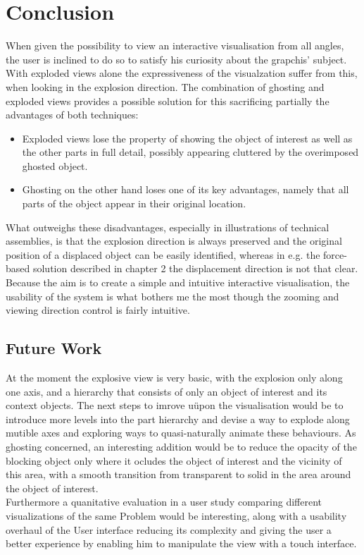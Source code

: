 \chapter{Conclusion}
When given the possibility to view an interactive visualisation from all angles, the user is inclined to do so to satisfy his curiosity about the grapchis' subject. With exploded views alone the expressiveness of the visualzation suffer from this, when looking in the explosion direction. The combination of ghosting and exploded views provides a possible solution for this sacrificing partially the advantages of both techniques:
\begin{itemize}
\item Exploded views lose the property of showing the object of interest as well as the other parts in full detail, possibly appearing cluttered by the overimposed ghosted object.
\item Ghosting on the other hand loses one of its key advantages, namely that all parts of the object appear in their original location.
\end{itemize}
What outweighs these disadvantages, especially in illustrations of technical assemblies, is that the explosion direction is always preserved and the original position of a displaced object can be easily identified, whereas in e.g. the force-based solution described in chapter 2 the displacement direction is not that clear.\\
Because the aim is to create a simple and intuitive interactive visualisation, the usability of the system is what bothers me the most though the zooming and viewing direction control is fairly intuitive.
\section{Future Work}
At the moment the explosive view is very basic, with the explosion only along one axis, and a hierarchy that consists of only  an object of interest and its context objects. The next steps to imrove uüpon the visualisation would be to introduce more levels into the part hierarchy and devise a way to explode along mutible axes and exploring ways to quasi-naturally animate these behaviours. As ghosting concerned, an interesting addition would be to reduce the opacity of the blocking object only where it ocludes the object of interest and the vicinity of this area, with a smooth transition from transparent to solid in the area around the object of interest.\\
Furthermore a quanitative evaluation in a user study comparing different visualizations of the same Problem would be interesting, along with a usability overhaul of the User interface reducing its complexity and giving the user a better experience by enabling him to manipulate the view with a touch interface.
